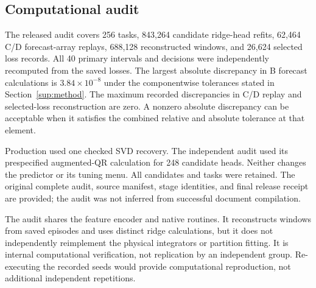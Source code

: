\subsection{Computational audit}
The released audit covers 256 tasks, 843,264 candidate ridge-head refits, 62,464 C/D forecast-array replays, 688,128 reconstructed windows, and 26,624 selected loss records. All 40 primary intervals and decisions were independently recomputed from the saved losses. The largest absolute discrepancy in B forecast calculations is $3.84\times10^{-8}$ under the componentwise tolerances stated in Section~\ref{sup:method}. The maximum recorded discrepancies in C/D replay and selected-loss reconstruction are zero. A nonzero absolute discrepancy can be acceptable when it satisfies the combined relative and absolute tolerance at that element.

Production used one checked SVD recovery. The independent audit used its prespecified augmented-QR calculation for 248 candidate heads. Neither changes the predictor or its tuning menu. All candidates and tasks were retained. The original complete audit, source manifest, stage identities, and final release receipt are provided; the audit was not inferred from successful document compilation.

The audit shares the feature encoder and native routines. It reconstructs windows from saved episodes and uses distinct ridge calculations, but it does not independently reimplement the physical integrators or partition fitting. It is internal computational verification, not replication by an independent group. Re-executing the recorded seeds would provide computational reproduction, not additional independent repetitions.
